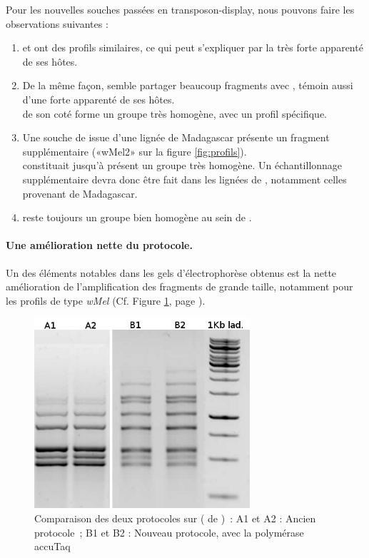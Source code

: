 Pour les nouvelles souches passées en transposon-display, nous pouvons faire les observations suivantes : 
\begin{enumerate}
	\item {} et  ont des profils similaires, ce qui peut s'expliquer par la très forte apparenté de ses hôtes.
	\item De la même façon,  semble partager beaucoup fragments avec , témoin aussi d'une forte apparenté de ses hôtes.\\
	 de son coté forme un groupe très homogène, avec un profil spécifique.
	\item Une souche de  issue d'une lignée de Madagascar présente un fragment supplémentaire («wMel2» sur la figure \ref{fig:profils}).\\
	 constituait jusqu'à présent un groupe très homogène.
	Un échantillonnage supplémentaire devra donc être fait dans les lignées de , notamment celles provenant de Madagascar.
	\item {} reste toujours un groupe bien homogène au sein de .
\end{enumerate}



\paragraph{Une amélioration nette du protocole.} %
\label{par:proto}
Un des éléments notables dans les gels d'électrophorèse obtenus est la nette amélioration de l'amplification des fragments de grande taille, notamment pour les profils de type \textit{wMel} (Cf. Figure \ref{fig:wMelcomp}, page \pageref{fig:wMelcomp}). 

\begin{figure}[h]
	\begin{center}
		\includegraphics[width=80mm]{images/wMel_comp.png}
	\end{center}
	\caption{Comparaison des deux protocoles sur  ( de )~:
	A1 et A2 : Ancien protocole\cite{memHH}~;
	B1 et B2 : Nouveau protocole, avec la polymérase accuTaq}
	\label{fig:wMelcomp}
\end{figure}

